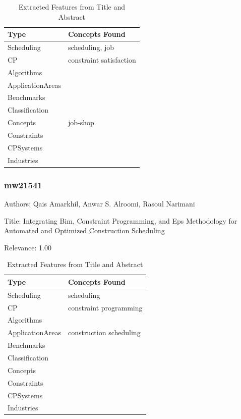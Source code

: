 {\scriptsize
\begin{longtable}{p{2cm}p{20cm}}
\caption{Extracted Features from Title and Abstract}\\ \toprule
Type & Concepts Found\\ \midrule
\endhead
\bottomrule
\endfoot
Scheduling & scheduling, job\\ 
CP & constraint satisfaction\\ 
Algorithms & \\ 
ApplicationAreas & \\ 
Benchmarks & \\ 
Classification & \\ 
Concepts & job-shop\\ 
Constraints & \\ 
CPSystems & \\ 
Industries & \\ 
\end{longtable}
}



\subsubsection{mw21541}
\label{mw:mw21541}

Authors: Qais Amarkhil, Anwar  S. Alroomi, Rasoul Narimani

Title: Integrating Bim, Constraint Programming, and Eps Methodology for Automated and Optimized Construction Scheduling

Relevance:  1.00

{\scriptsize
\begin{longtable}{p{2cm}p{20cm}}
\caption{Extracted Features from Title and Abstract}\\ \toprule
Type & Concepts Found\\ \midrule
\endhead
\bottomrule
\endfoot
Scheduling & scheduling\\ 
CP & constraint programming\\ 
Algorithms & \\ 
ApplicationAreas & construction scheduling\\ 
Benchmarks & \\ 
Classification & \\ 
Concepts & \\ 
Constraints & \\ 
CPSystems & \\ 
Industries & \\ 
\end{longtable}
}



